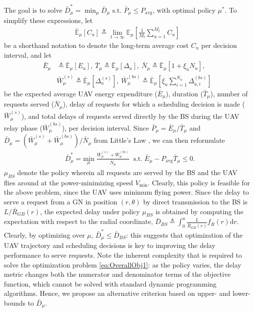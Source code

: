 \documentclass[10pt, twocolumn]{IEEEtran}
\theoremstyle{plain}
\theoremstyle{definition}
\theoremstyle{remark}
\begin{document}
The goal is to solve $\bar{D}_{\mu}^{*}{=}\min_{\mu}\bar{D}_{\mu}\text{ s.t. }\bar{P}_{\mu}{\leq}P_{\mathrm{avg}}$, with optimal policy $\mu^{*}$. To simplify these expressions, let
\begin{align}
    \bar{\mathbb{E}}_{\mu}[C_u]\triangleq\lim\limits_{t \rightarrow \infty} \mathbb{E}_{\mu}\left[\frac{1}{M_t} \sum_{u = 1}^{M_t }C_u\right]
\end{align}
be a shorthand notation to denote the long-term average cost $C_u$ per decision interval, and let
\begin{align}
    \bar{E}_{\mu}&{\triangleq}\bar{\mathbb{E}}_{\mu} \left[E_u\right],\ \bar{T}_{\mu}{\triangleq}\bar{\mathbb{E}}_{\mu} \left[\Delta_u\right],\ \bar{N}_{\mu}{\triangleq}\bar{\mathbb{E}}_{\mu} \left[1+\xi_uN_u\right],\\& \bar{W}_{\mu}^{(s)}{\triangleq}\bar{\mathbb{E}}_{\mu}\left[\Delta_u^{(s)}\right],\ \bar{W}_{\mu}^{(bs)}{\triangleq}\bar{\mathbb{E}}_{\mu}\left[\xi_u\sum_{i=1}^{N_u}\Delta_{u,i}^{(bs)}\right]
\end{align}
be the expected average UAV energy expenditure ($\bar{E}_{\mu}$), duration ($\bar{T}_{\mu}$), number of requests served ($\bar{N}_{\mu}$), delay of requests for which a scheduling decision is made ($\bar{W}_{\mu}^{(s)}$), and total delays of requests served directly by the BS during the UAV relay phase
($\bar{W}_{\mu}^{(bs)}$), per decision interval. 
Since $\bar{P}_{\mu}{=}\bar{E}_{\mu}/\bar{T}_{\mu}$ and $\bar{D}_{\mu}{=}(\bar{W}_{\mu}^{(s)}+\bar{W}_{\mu}^{(bs)})/\bar{N}_{\mu}$ from Little's Law \cite{LittlesLaw},
we can then reformulate
\begin{align}\label{eq:OverallObj1}
    &\bar{D}_{\mu}^{*} = \underset{\mu}{\mathrm{min}} \; 
	\frac{\bar{W}_{\mu}^{(s)}+\bar{W}_{\mu}^{(bs)}}{\bar{N}_{\mu}}\;\;
	\mathrm{s.t.} \; \bar{E}_{\mu}-P_{\mathrm{avg}}\bar{T}_{\mu}\leq 0.
\end{align}
 $\mu_{BS}$ denote the policy wherein all requests are served by the BS and the UAV flies around at the power-minimizing speed $V_{\mathrm{min}}$. Clearly, this policy is feasible for the above problem, since the UAV uses minimum flying power.
Since the delay to serve a request from a GN in position $(r,\theta)$ by direct transmission to the BS is $L/\bar R_{GB}(r)$,  the expected delay under policy $\mu_{BS}$ is obtained by computing the expectation with respect to the radial coordinate, $\bar{D}_{BS}{\triangleq}\int_{0}^{a}\frac{L}{\bar{R}_{GB}(r)}f_{R}(r)\mathrm{d}r$. Clearly, by optimizing over $\mu$, $\bar{D}_{\mu}^{*}{\leq}\bar{D}_{BS}$: this suggests that optimization of the UAV trajectory and scheduling decisions is key to improving the delay performance to serve requests. Note the inherent complexity that is required to solve the optimization problem \eqref{eq:OverallObj1}: as the policy varies, the delay metric changes both the numerator and denominator terms of the objective function, which cannot be solved with standard dynamic programming algorithms. Hence, we propose an alternative criterion based on upper- and lower-bounds to $\bar{D}_{\mu}$.\\
\end{document}

